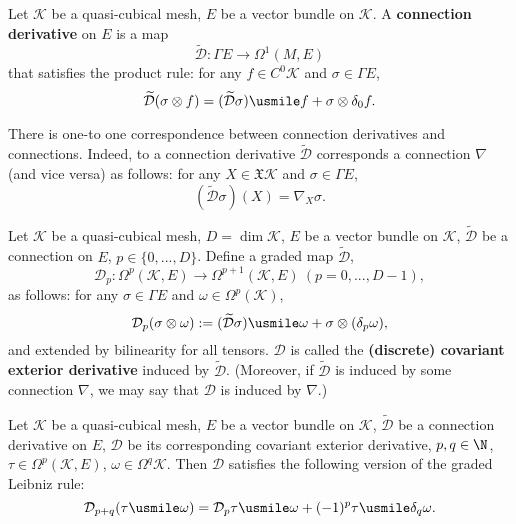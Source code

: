 \begin{definition}
  Let
    $\mathcal{K}$ be a quasi-cubical mesh,
    $E$ be a vector bundle on $\mathcal{K}$.
  A \textbf{connection derivative} on $E$ is a map
  \begin{equation}
    \widetilde{\mathcal{D}} \colon \Gamma E \to \Omega^1(M, E)
  \end{equation}
  that satisfies the product rule:
  for any $f \in C^0 \mathcal{K}$ and $\sigma \in \Gamma E$,
  \begin{equation}
    \widetilde{\mathcal{D}}(\sigma \otimes f)
    = (\widetilde{\mathcal{D}} \sigma) \usmile f + \sigma \otimes \delta_0 f.
  \end{equation}
\end{definition}
\begin{remark}
  There is one-to one correspondence between connection derivatives and
  connections.
  Indeed, to a connection derivative $\widetilde{\mathcal{D}}$ corresponds a
  connection $\nabla$ (and vice versa) as follows:
  for any $X \in \mathfrak{X} \mathcal{K}$ and $\sigma \in \Gamma E$,
  \begin{equation}
    (\widetilde{\mathcal{D}} \sigma)(X) = \nabla_X \sigma.
  \end{equation}
\end{remark}
\begin{definition}
  Let
    $\mathcal{K}$ be a quasi-cubical mesh,
    $D = \dim \mathcal{K}$,
    $E$ be a vector bundle on $\mathcal{K}$,
    $\widetilde{\mathcal{D}}$ be a connection on $E$, 
    $p \in \{0, ..., D\}$.
  Define a graded map $\widetilde{\mathcal{D}}$,
  \begin{equation}
    \mathcal{D}_p
    \colon \Omega^p(\mathcal{K}, E) \to \Omega^{p + 1}(\mathcal{K}, E)\
    (p = 0, ..., D - 1),
  \end{equation}
  as follows:
  for any $\sigma \in \Gamma E$ and $\omega \in \Omega^p(\mathcal{K})$,
  \begin{equation}
    \mathcal{D}_p(\sigma \otimes \omega)
    := (\widetilde{\mathcal{D}} \sigma) \usmile \omega
    + \sigma \otimes (\delta_p \omega),
  \end{equation}
  and extended by bilinearity for all tensors.
  $\mathcal{D}$ is called the \textbf{(discrete) covariant exterior derivative}
  induced by $\widetilde{\mathcal{D}}$.
  (Moreover, if $\widetilde{\mathcal{D}}$ is induced by some connection
  $\nabla$, we may say that $\mathcal{D}$ is induced by $\nabla$.)
\end{definition}
\begin{proposition}
  Let
    $\mathcal{K}$ be a quasi-cubical mesh,
    $E$ be a vector bundle on $\mathcal{K}$,
    $\widetilde{\mathcal{D}}$ be a connection derivative on $E$,
    $\mathcal{D}$ be its corresponding covariant exterior derivative,
    $p, q \in \N$,
    $\tau \in \Omega^p(\mathcal{K}, E)$,
    $\omega \in \Omega^q \mathcal{K}$.
  Then $\mathcal{D}$ satisfies the following version of the graded Leibniz rule:
  \begin{equation}
    \mathcal{D}_{p + q}(\tau \usmile \omega)
    = \mathcal{D}_p \tau \usmile \omega + (-1)^p \tau \usmile \delta_q \omega.
  \end{equation}
\end{proposition}
